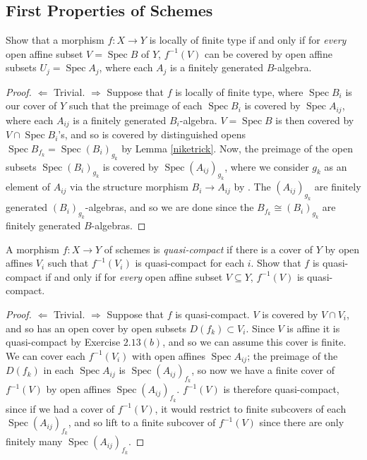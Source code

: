 \documentclass[10pt]{article}
\theoremstyle{definition}
\theoremstyle{remark}
\numberwithin{equation}{section}
\numberwithin{figure}{subsubsection}
\DeclareMathOperator{\Spec}{Spec}
\begin{document}
\subsection{First Properties of Schemes}
\begin{problem}
  Show that a morphism $f \colon X \to Y$ is locally of finite type if and only if for \emph{every} open affine subset $V = \Spec B$ of $Y$, $f^{-1}(V)$ can be covered by open affine subsets $U_j = \Spec A_j$, where each $A_j$ is a finitely generated $B$-algebra.
\end{problem}
\begin{proof}
  $\Leftarrow$ Trivial. $\Rightarrow$ Suppose that $f$ is locally of finite
  type, where $\Spec B_i$ is our cover of $Y$ such that the preimage of each
  $\Spec B_i$ is covered by $\Spec A_{ij}$, where each $A_{ij}$ is a finitely
  generated $B_i$-algebra. $V = \Spec B$ is then covered by $V
  \cap \Spec B_i$'s, and so is covered by distinguished opens $\Spec B_{f_k} =
  \Spec (B_i)_{g_k}$ by Lemma \ref{niketrick}. Now, the preimage of the open
  subsets $\Spec (B_i)_{g_k}$ is covered by $\Spec (A_{ij})_{g_k}$, where we
  consider $g_k$ as an element of $A_{ij}$ via the structure morphism $B_i \to
  A_{ij}$ by \cite[1.21$i$]{AM69}. The $(A_{ij})_{g_k}$ are finitely generated $(B_i)_{g_k}$-algebras, and so we are done since the $B_{f_k} \cong (B_i)_{g_k}$ are finitely generated $B$-algebras.
\end{proof}

\begin{problem}
  A morphism $f\colon X \to Y$ of schemes is \emph{quasi-compact} if there is a cover of $Y$ by open affines $V_i$ such that $f^{-1}(V_i)$ is quasi-compact for each $i$. Show that $f$ is quasi-compact if and only if for \emph{every} open affine subset $V \subseteq Y$, $f^{-1}(V)$ is quasi-compact.
\end{problem}
\begin{proof}
  $\Leftarrow$ Trivial. $\Rightarrow$ Suppose that $f$ is quasi-compact. $V$ is covered by $V \cap V_i$, and so has an open cover by open subsets $D(f_k) \subset V_i$. Since $V$ is affine it is quasi-compact by Exercise $2.13(b)$, and so we can assume this cover is finite. We can cover each $f^{-1}(V_i)$ with open affines $\Spec A_{ij}$; the preimage of the $D(f_k)$ in each $\Spec A_{ij}$ is $\Spec (A_{ij})_{f_k}$, so now we have a finite cover of $f^{-1}(V)$ by open affines $\Spec (A_{ij})_{f_k}$. $f^{-1}(V)$ is therefore quasi-compact, since if we had a cover of $f^{-1}(V)$, it would restrict to finite subcovers of each $\Spec (A_{ij})_{f_k}$, and so lift to a finite subcover of $f^{-1}(V)$ since there are only finitely many $\Spec (A_{ij})_{f_k}$.
\end{proof}
\end{document}
